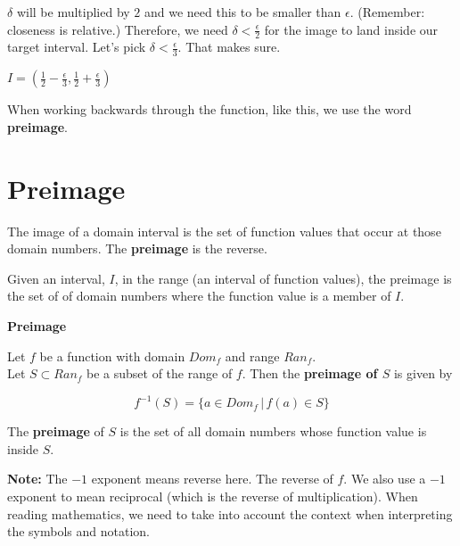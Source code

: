 \documentclass{ximera}
\begin{document}
$\delta$ will be multiplied by $2$ and we need this to be smaller than $\epsilon$.  (Remember: closeness is relative.) Therefore, we need $\delta < \frac{\epsilon}{2}$ for the image to land inside our target interval.  Let's pick $\delta < \frac{\epsilon}{3}$.  That makes sure. 



$I = \left( \frac{1}{2} - \frac{\epsilon}{3}, \frac{1}{2} + \frac{\epsilon}{3} \right)$




When working backwards through the function, like this, we use the word \textbf{preimage}.



























\section*{Preimage}




The image of a domain interval is the set of function values that occur at those domain numbers.  The \textbf{preimage} is the reverse.  

Given an interval, $I$, in the range (an interval of function values), the preimage is the set of of domain numbers where the function value is a member of $I$.





\begin{definition}  \textbf{\textcolor{blue!55!black}{Preimage}}

Let $f$ be a function with domain $Dom_f$ and range $Ran_f$. \\
Let $S \subset Ran_f$ be a subset of the range of $f$.  Then the \textbf{preimage of $S$} is given by

\[       f^{-1}(S) = \{   a \in Dom_f  \, | \, f(a) \in S  \}             \]



The \textbf{preimage} of $S$ is the set of all domain numbers whose function value is inside $S$.


\textbf{Note:}  The $-1$ exponent means reverse here. The reverse of $f$.  We also use a $-1$ exponent to mean reciprocal (which is the reverse of multiplication).  When reading mathematics, we need to take into account the context when interpreting the symbols and notation.


\end{definition}
\end{document}
